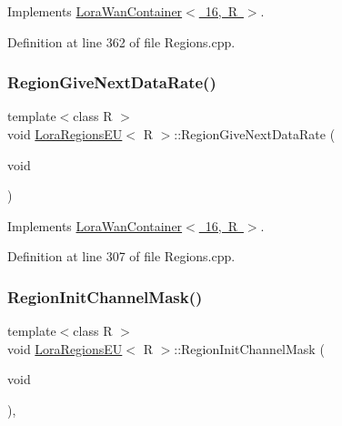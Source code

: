 Implements \mbox{\hyperlink{class_lora_wan_container_a3ced7ed5217292b17d3f554fdc12c45e}{Lora\+Wan\+Container$<$ 16, R $>$}}.



Definition at line 362 of file Regions.\+cpp.

\mbox{\label{class_lora_regions_e_u_a10897e9e39c1b1682596b9e55844724c}} 
\subsubsection{\texorpdfstring{Region\+Give\+Next\+Data\+Rate()}{RegionGiveNextDataRate()}}
{\footnotesize\ttfamily template$<$class R $>$ \\
void \mbox{\hyperlink{class_lora_regions_e_u}{Lora\+Regions\+EU}}$<$ R $>$\+::Region\+Give\+Next\+Data\+Rate (\begin{DoxyParamCaption}\item[{void}]{ }\end{DoxyParamCaption})\hspace{0.3cm}{\ttfamily [virtual]}}



Implements \mbox{\hyperlink{class_lora_wan_container_a32179d92bac6a7daea1bd39e84dec2a6}{Lora\+Wan\+Container$<$ 16, R $>$}}.



Definition at line 307 of file Regions.\+cpp.

\mbox{\label{class_lora_regions_e_u_a3662471b098dc1e319ab386eaf0b3f52}} 
\subsubsection{\texorpdfstring{Region\+Init\+Channel\+Mask()}{RegionInitChannelMask()}}
{\footnotesize\ttfamily template$<$class R $>$ \\
void \mbox{\hyperlink{class_lora_regions_e_u}{Lora\+Regions\+EU}}$<$ R $>$\+::Region\+Init\+Channel\+Mask (\begin{DoxyParamCaption}\item[{void}]{ }\end{DoxyParamCaption})\hspace{0.3cm}{\ttfamily [protected]}, {\ttfamily [virtual]}}



